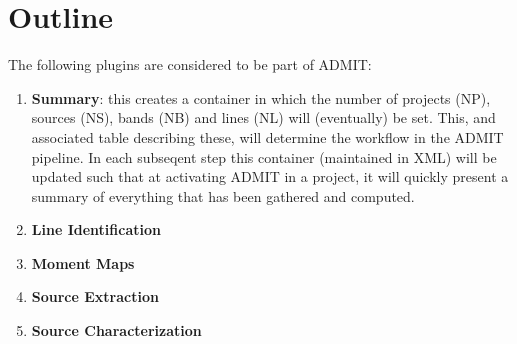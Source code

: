 \documentclass[preprint]{aastex} %
\begin{document}
\section{Outline}

The following plugins are considered to be part of ADMIT:

\begin{enumerate}

\item
{\bf Summary}: this creates a container in which the number of projects (NP),
sources (NS), bands (NB) and lines (NL) will (eventually) be set. This, and 
associated table describing these, will determine the workflow in the
ADMIT pipeline. In each subseqent step this container (maintained in XML) will
be updated such that at activating ADMIT in a project, it will quickly
present a summary of everything that has been gathered and computed.

\item
{\bf Line Identification}


\item
{\bf Moment Maps}


\item
{\bf Source Extraction}


\item
{\bf Source Characterization}


\end{enumerate}
\end{document}
